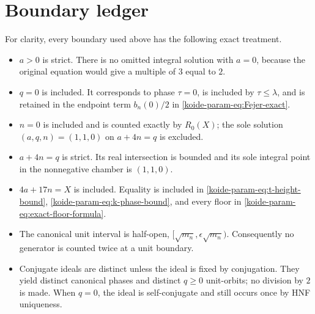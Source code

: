 \section{Boundary ledger}

For clarity, every boundary used above has the following exact treatment.
\begin{itemize}
 \item $a>0$ is strict.  There is no omitted integral solution with
 $a=0$, because the original equation would give a multiple of $3$ equal
 to $2$.
 \item $q=0$ is included.  It corresponds to phase $\tau=0$, is included
 by $\tau\leq\lambda$, and is retained in the endpoint term
 $b_n(0)/2$ in \eqref{koide-param-eq:Fejer-exact}.
 \item $n=0$ is included and is counted exactly by $R_0(X)$; the sole
 solution $(a,q,n)=(1,1,0)$ on $a+4n=q$ is excluded.
 \item $a+4n=q$ is strict.  Its real intersection is bounded and its sole
 integral point in the nonnegative chamber is $(1,1,0)$.
 \item $4a+17n=X$ is included.  Equality is included in
 \eqref{koide-param-eq:t-height-bound}, \eqref{koide-param-eq:k-phase-bound}, and every floor in
 \eqref{koide-param-eq:exact-floor-formula}.
 \item The canonical unit interval is half-open,
 $[\sqrt{m_n},\epsilon\sqrt{m_n})$.  Consequently no generator is counted
 twice at a unit boundary.
 \item Conjugate ideals are distinct unless the ideal is fixed by
 conjugation.  They yield distinct canonical phases and distinct
 $q\geq0$ unit-orbits; no division by $2$ is made.  When $q=0$, the ideal
 is self-conjugate and still occurs once by HNF uniqueness.
\end{itemize}
